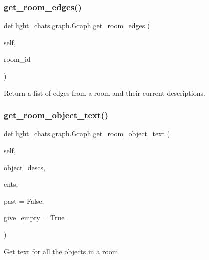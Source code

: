 \subsubsection{\texorpdfstring{get\+\_\+room\+\_\+edges()}{get\_room\_edges()}}
{\footnotesize\ttfamily def light\+\_\+chats.\+graph.\+Graph.\+get\+\_\+room\+\_\+edges (\begin{DoxyParamCaption}\item[{}]{self,  }\item[{}]{room\+\_\+id }\end{DoxyParamCaption})}

\begin{DoxyVerb}Return a list of edges from a room and their current descriptions.
\end{DoxyVerb}
 \mbox{\label{classlight__chats_1_1graph_1_1Graph_a4d24052d36cff3896424e2e3bce2d554}} 
\subsubsection{\texorpdfstring{get\+\_\+room\+\_\+object\+\_\+text()}{get\_room\_object\_text()}}
{\footnotesize\ttfamily def light\+\_\+chats.\+graph.\+Graph.\+get\+\_\+room\+\_\+object\+\_\+text (\begin{DoxyParamCaption}\item[{}]{self,  }\item[{}]{object\+\_\+descs,  }\item[{}]{ents,  }\item[{}]{past = {\ttfamily False},  }\item[{}]{give\+\_\+empty = {\ttfamily True} }\end{DoxyParamCaption})}

\begin{DoxyVerb}Get text for all the objects in a room.
\end{DoxyVerb}
 \mbox{\label{classlight__chats_1_1graph_1_1Graph_ad078aab1d28474ac43e8b58ba0fb586b}} 

